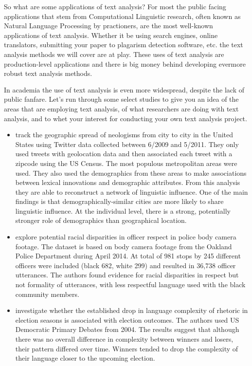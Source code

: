 \documentclass[
]{article}
\newenvironment{rmdblock}[1]
  {\begin{shaded*}
  \begin{itemize}
  \renewcommand{\labelitemi}{
    \raisebox{-.5\height}[0pt][0pt]{
      {\setkeys{Gin}{width=2em,keepaspectratio}\texttt{[image: assets/images/\#1]}}
    }
  }
  \item
  }
  {
  \end{itemize}
  \end{shaded*}
  }
\newenvironment{rmdtodo}
  {\begin{rmdblock}{paper}}
  {\end{rmdblock}}
\begin{document}
So what are some applications of text analysis? For most the public facing applications that stem from Computational Linguistic research, often known as Natural Language Processing by practioners, are the most well-known applications of text analysis. Whether it be using search engines, online translators, submitting your paper to plagarism detection software, etc. the text analysis methods we will cover are at play. These uses of text analysis are production-level applications and there is big money behind developing evermore robust text analysis methods.

In academia the use of text analysis is even more widespread, despite the lack of public fanfare. Let's run through some select studies to give you an idea of the areas that are employing text analysis, of what researchers are doing with text analysis, and to whet your interest for conducting your own text analysis project.

\begin{rmdtodo}
\citet{Eisenstein2012} track the geographic spread of neologisms from city to city in the United States using Twitter data collected between 6/2009 and 5/2011. They only used tweets with geolocation data and then associated each tweet with a zipcode using the US Census. The most populous metropolitan areas were used. They also used the demographics from these areas to make associations between lexical innovations and demographic attributes. From this analysis they are able to reconstruct a network of linguistic influence. One of the main findings is that demographically-similar cities are more likely to share linguistic influence. At the individual level, there is a strong, potentially stronger role of demographics than geographical location.
\end{rmdtodo}

\begin{rmdtodo}
\citet{Voigt2017} explore potential racial disparities in officer respect in police body camera footage. The dataset is based on body camera footage from the Oakland Police Department during April 2014. At total of 981 stops by 245 different officers were included (black 682, white 299) and resulted in 36,738 officer utterances. The authors found evidence for racial disparities in respect but not formality of utterances, with less respectful language used with the black community members.
\end{rmdtodo}

\begin{rmdtodo}
\citet{Conway2012} investigate whether the established drop in language complexity of rhetoric in election seasons is associated with election outcomes. The authors used US Democratic Primary Debates from 2004. The results suggest that although there was no overall difference in complexity between winners and losers, their pattern differed over time. Winners tended to drop the complexity of their language closer to the upcoming election.
\end{rmdtodo}
\end{document}
